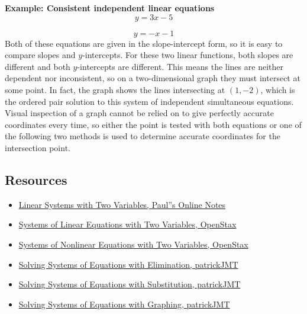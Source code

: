 \textbf{Example: Consistent independent linear equations}
\[
y = 3x - 5
\]

\[
y = -x - 1
\]
Both of these equations are given in the slope-intercept form, so it is easy to compare slopes and $y$-intercepts. For these two linear functions, both slopes are different and both $y$-intercepts are different. This means the lines are neither dependent nor inconsistent, so on a two-dimensional graph they must intersect at some point. In fact, the graph shows the lines intersecting at $(1, -2)$, which is the ordered pair solution to this system of independent simultaneous equations. Visual inspection of a graph cannot be relied on to give perfectly accurate coordinates every time, so either the point is tested with both equations or one of the following two methods is used to determine accurate coordinates for the intersection point.


\subsection{Resources}
\label{sss:reso-55b5}

\begin{itemize}
    \item \href{https://tutorial.math.lamar.edu/classes/alg/systemstwovrble.aspx}{Linear Systems with Two Variables, Paul''s Online Notes}
    \item \href{https://openstax.org/books/college-algebra/pages/7-1-systems-of-linear-equations-two-variables}{Systems of Linear Equations with Two Variables, OpenStax}
    \item \href{https://openstax.org/books/college-algebra/pages/7-3-systems-of-nonlinear-equations-and-inequalities-two-variables}{Systems of Nonlinear Equations with Two Variables, OpenStax}
    \item \href{https://www.youtube.com/watch?v=ej25myhYcSg}{Solving Systems of Equations with Elimination, patrickJMT}
    \item \href{https://www.youtube.com/watch?v=cwHR_B9zK7k}{Solving Systems of Equations with Substitution, patrickJMT}
    \item \href{https://www.youtube.com/watch?v=WNkPKv0OTGI}{Solving Systems of Equations with Graphing, patrickJMT}
\end{itemize}

